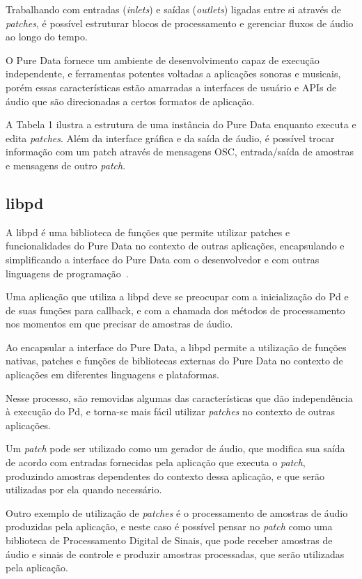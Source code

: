 \documentclass[a4paper, 11pt, twoside]{article}
\begin{document}
\begin{multicols}{2}
Trabalhando com entradas (\textit{inlets}) e saídas (\textit{outlets}) ligadas 
entre si através de \textit{patches}, é possível estruturar blocos de 
processamento e gerenciar fluxos de áudio ao longo do tempo.

O Pure Data fornece um ambiente de desenvolvimento
capaz de execução independente, e ferramentas potentes
voltadas a aplicações sonoras e musicais, porém essas 
características estão amarradas a interfaces de usuário 
e APIs de áudio que são direcionadas a certos formatos de aplicação.

A Tabela 1 ilustra a estrutura de uma instância do Pure Data
enquanto executa e edita \textit{patches}. Além da interface
gráfica e da saída de áudio, é possível trocar informação com um patch através
de mensagens OSC, entrada/saída de amostras e mensagens de outro \textit{patch}.

\subsection{libpd}

A libpd é uma biblioteca de funções que permite utilizar patches e 
funcionalidades do Pure Data no contexto de outras aplicações,
encapsulando e simplificando a interface do Pure Data com o
desenvolvedor e com outras linguagens de programação~\cite{libpd1}.

Uma aplicação que utiliza a libpd deve se preocupar com a inicialização do Pd
e de suas funções para callback, e com a chamada dos métodos 
de processamento nos momentos em que precisar de amostras de áudio.

Ao encapsular a interface do Pure Data, a libpd
permite a utilização de funções nativas, patches e funções de 
bibliotecas externas do Pure Data no contexto de aplicações em 
diferentes linguagens e plataformas.

Nesse processo, são removidas algumas das características
que dão independência à execução do Pd, e torna-se 
mais fácil utilizar \textit{patches} no contexto de outras aplicações.

Um \textit{patch} pode ser utilizado como um gerador de áudio,
que modifica sua saída de acordo com entradas fornecidas pela
aplicação que executa o \textit{patch}, produzindo amostras 
dependentes do contexto dessa aplicação, e que serão utilizadas 
por ela quando necessário.

Outro exemplo de utilização de \textit{patches} é o processamento de
amostras de áudio produzidas pela aplicação, e neste caso é possível
pensar no \textit{patch} como uma biblioteca de Processamento Digital
de Sinais, que pode receber amostras de áudio e sinais de controle e produzir
amostras processadas, que serão utilizadas pela aplicação.


\end{multicols}
\end{document}
